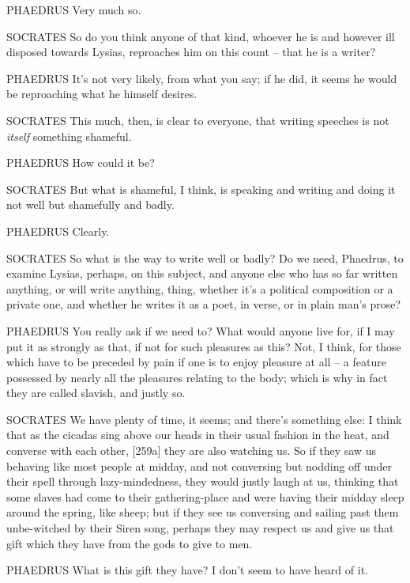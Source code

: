 PHAEDRUS Very much so.

SOCRATES So do you think anyone of that kind, whoever he is and however
ill disposed towards Lysias, reproaches him on this count -- that he is
a writer?

 PHAEDRUS It's not very likely, from what you say; if he did,
it seems he would be reproaching what he himself desires.

 SOCRATES This much, then, is clear to everyone, that writing
speeches is not {\em itself} something shameful.

PHAEDRUS How could it be?

SOCRATES But what is shameful, I think, is speaking and writing 
and doing it not well but shamefully and badly.

PHAEDRUS Clearly.

SOCRATES So what is the way to write well or badly? Do we need,
Phaedrus, to examine Lysias, perhaps, on this subject, and anyone else
who has so far written anything, or will write anything, thing,
 whether it's a political composition or a private one, and
whether he writes it as a poet, in verse, or in plain man's prose?

PHAEDRUS You really ask if we need to? What would anyone  live
for, if I may put it as strongly as that, if not for such pleasures as
this? Not, I think, for those which have to be preceded by pain if one
is to enjoy pleasure at all -- a feature possessed by nearly all the
pleasures relating to the body; which is why in fact they are called
slavish, and justly so.


SOCRATES We have plenty of time, it seems; and there's something else: I
think that as the cicadas sing above our heads in their usual fashion in
the heat, and converse
with each other,
{[}259a{]} they are also watching us. So if they saw us behaving like
most people at midday, and not conversing but nodding off under their
spell through lazy-mindedness, they would justly laugh at us, thinking
that some slaves had come to their gathering-place  and were
having their midday sleep around the spring, like sheep; but if they see
us conversing and sailing past them unbe-witched by their Siren song,
perhaps they may respect us and  give us that gift which they
have from the gods to give to men.

PHAEDRUS What is this gift they have? I don't seem to have heard of it.


